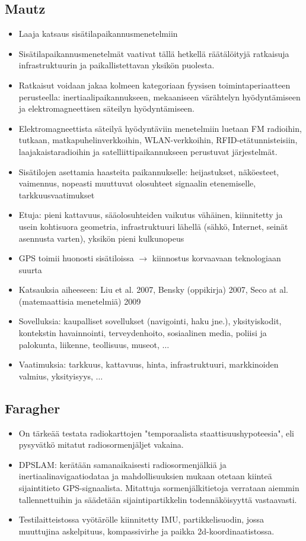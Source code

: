 \documentclass[a4paper]{scrartcl}
\begin{document}
\subsection{Mautz\cite{mautz2012indoor}}
\begin{itemize}
	\item Laaja katsaus sisätilapaikannusmenetelmiin
	\item Sisätilapaikannusmenetelmät vaativat tällä hetkellä räätälöityjä
		ratkaisuja infrastruktuurin ja paikallistettavan yksikön puolesta.
	\item Ratkaisut voidaan jakaa kolmeen kategoriaan fyysisen
		toimintaperiaatteen perusteella: inertiaalipaikannukseen, mekaaniseen
		värähtelyn hyödyntämiseen ja elektromagneettisen säteilyn hyödyntämiseen.
	\item Elektromagneettista säteilyä hyödyntäviin menetelmiin luetaan
		FM radioihin, tutkaan, matkapuhelinverkkoihin, WLAN-verkkoihin,
		RFID-etätunnisteisiin, laajakaistaradioihin ja satelliittipaikannukseen
		perustuvat järjestelmät.
	\item Sisätilojen asettamia haasteita paikannukselle: heijastukset,
		näköesteet, vaimennus, nopeasti muuttuvat olosuhteet signaalin etenemiselle,
		tarkkuusvaatimukset
	\item Etuja: pieni kattavuus, sääolosuhteiden vaikutus vähäinen, kiinnitetty
		ja usein kohtisuora geometria, infrastruktuuri lähellä (sähkö, Internet,
		seinät asennusta varten), yksikön pieni kulkunopeus
	\item GPS toimii huonosti sisätiloissa $\rightarrow$ kiinnostus
		korvaavaan teknologiaan suurta
	\item Katsauksia aiheeseen: Liu et al. 2007, Bensky (oppikirja) 2007,
		Seco at al. (matemaattisia menetelmiä) 2009
	\item Sovelluksia: kaupalliset sovellukset (navigointi, haku jne.),
		yksityiskodit, kontekstin havainnointi, terveydenhoito, sosiaalinen media,
    poliisi ja palokunta, liikenne, teollisuus, museot, $\dots$
  \item Vaatimuksia: tarkkuus, kattavuus, hinta, infrastruktuuri,
    markkinoiden valmius, yksityisyys, $\ldots$
\end{itemize}


\subsection{Faragher\cite{faragher2012opportunistic}}
\begin{itemize}
  \item On tärkeää testata radiokarttojen "temporaalista staattisuushypoteesia",
    eli pysyvätkö mitatut radiosormenjäljet vakaina.
  \item DPSLAM: kerätään samanaikaisesti radiosormenjälkiä ja
    inertiaalinavigaatiodataa ja mahdollisuuksien mukaan otetaan kiinteä
    sijaintitieto GPS-signaalista. Mitattuja sormenjälkitietoja verrataan
    aiemmin tallennettuihin ja säädetään sijaintipartikkelin todennäköisyyttä
    vastaavasti.
  \item Testilaitteistossa vyötärölle kiinnitetty IMU, partikkelisuodin, jossa
    muuttujina askelpituus, kompassivirhe ja paikka 2d-koordinaatistossa.
\end{itemize}
\end{document}
